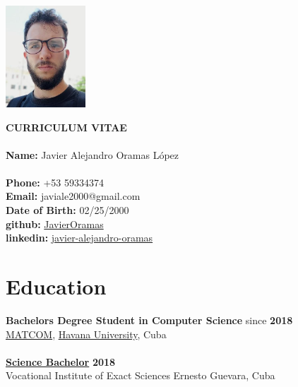 \documentclass{article}
\begin{document}
\pagestyle{empty} %

\begin{center}
    \begin{minipage}[t]{0.2\textwidth}
        \vspace{0pt}
        \includegraphics[width=3cm]{img.png}
    \end{minipage}
    \hspace{1cm}
    \begin{minipage}[t]{0.7\textwidth}
        \vspace{0pt}
        \textbf{CURRICULUM VITAE}\\\\
        \textbf{Name:} Javier Alejandro Oramas López\\
        \\
        \textbf{Phone:} +53 59334374 \\
        \textbf{Email:} javiale2000@gmail.com \\
        \textbf{Date of Birth:}  02/25/2000\\
        \textbf{github:} \href{https://github.com/JavierOramas}{JavierOramas} \\
        \textbf{linkedin:} \href{https://www.linkedin.com/in/javier-alejandro-oramas-l%C3%B3pez-7ab47b160/}{javier-alejandro-oramas} \\
    \end{minipage}
\end{center}

\section*{Education}
\textbf{Bachelors Degree Student in Computer Science} \hfill since \textbf{2018}\\
\href{https://matcom.in/}{MATCOM}, \href{https://uh.cu}{Havana University}, Cuba\\
\vspace{0.1cm}\\
\textbf{\hyperref[sec:bachelor]{Science Bachelor}} \hfill \textbf{2018}\\
Vocational Institute of Exact Sciences  Ernesto Guevara, Cuba
\end{document}
